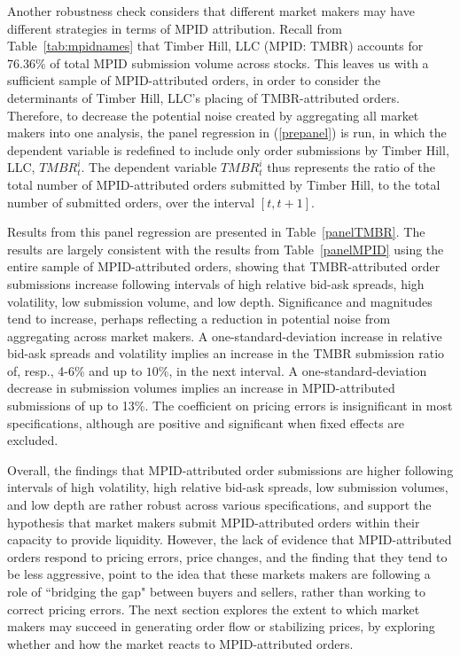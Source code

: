 \documentclass{article}
\begin{document}
Another robustness check considers that different market makers may have different strategies in terms of MPID attribution. Recall from Table~\ref{tab:mpidnames} that Timber Hill, LLC (MPID: TMBR) accounts for 76.36\% of total MPID submission volume across stocks. This leaves us with a sufficient sample of MPID-attributed orders, in order to consider the determinants of Timber Hill, LLC's placing of TMBR-attributed orders. Therefore, to decrease the potential noise created by aggregating all market makers into one analysis, the panel regression in (\ref{prepanel}) is run, in which the dependent variable is redefined to include only order submissions by Timber Hill, LLC, $TMBR_t^i$. The dependent variable $TMBR_t^i$ thus represents the ratio of the total number of MPID-attributed orders submitted by Timber Hill, to the total number of submitted orders, over the interval $[t,t+1]$.

Results from this panel regression are presented in Table~\ref{panelTMBR}. The results are largely consistent with the results from Table~\ref{panelMPID} using the entire sample of MPID-attributed orders, showing that TMBR-attributed order submissions increase following intervals of high relative bid-ask spreads, high volatility, low submission volume, and low depth. Significance and magnitudes tend to increase, perhaps reflecting a reduction in potential noise from aggregating across market makers. A one-standard-deviation increase in relative bid-ask spreads and volatility implies an increase in the TMBR submission ratio of, resp., 4-6\% and up to $10\%$, in the next interval. A one-standard-deviation decrease in submission volumes implies an increase in MPID-attributed submissions of up to 13\%. The coefficient on pricing errors is insignificant in most specifications, although are positive and significant when fixed effects are excluded.


Overall, the findings that MPID-attributed order submissions are higher following intervals of high volatility, high relative bid-ask spreads, low submission volumes, and low depth are rather robust across various specifications, and support the hypothesis that market makers submit MPID-attributed orders within their capacity to provide liquidity. However, the lack of evidence that MPID-attributed orders respond to pricing errors, price changes, and the finding that they tend to be less aggressive, point to the idea that these markets makers are following a role of ``bridging the gap" between buyers and sellers, rather than working to correct pricing errors. The next section explores the extent to which market makers may succeed in generating order flow or stabilizing prices, by exploring whether and how the market reacts to MPID-attributed orders.
\end{document}
